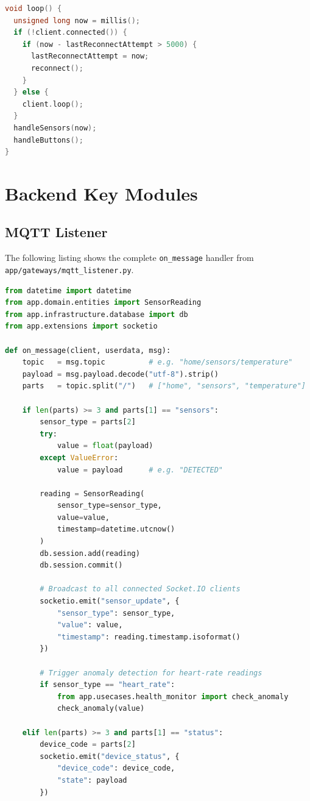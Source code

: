 \begin{lstlisting}[style=mystyle, language=C++, caption={ESP32.ino --- complete firmware source code}, label={lst:esp32}]
void loop() {
  unsigned long now = millis();
  if (!client.connected()) {
    if (now - lastReconnectAttempt > 5000) {
      lastReconnectAttempt = now;
      reconnect();
    }
  } else {
    client.loop();
  }
  handleSensors(now);
  handleButtons();
}
\end{lstlisting}

\chapter{Backend Key Modules}

\section{MQTT Listener}

The following listing shows the complete \texttt{on\_message} handler from \texttt{app/gateways/mqtt\_listener.py}.

\begin{lstlisting}[style=mystyle, language=Python,
  caption={MQTT listener --- on\_message handler},
  label={lst:mqtt}]
from datetime import datetime
from app.domain.entities import SensorReading
from app.infrastructure.database import db
from app.extensions import socketio

def on_message(client, userdata, msg):
    topic   = msg.topic          # e.g. "home/sensors/temperature"
    payload = msg.payload.decode("utf-8").strip()
    parts   = topic.split("/")   # ["home", "sensors", "temperature"]

    if len(parts) >= 3 and parts[1] == "sensors":
        sensor_type = parts[2]
        try:
            value = float(payload)
        except ValueError:
            value = payload      # e.g. "DETECTED"

        reading = SensorReading(
            sensor_type=sensor_type,
            value=value,
            timestamp=datetime.utcnow()
        )
        db.session.add(reading)
        db.session.commit()

        # Broadcast to all connected Socket.IO clients
        socketio.emit("sensor_update", {
            "sensor_type": sensor_type,
            "value": value,
            "timestamp": reading.timestamp.isoformat()
        })

        # Trigger anomaly detection for heart-rate readings
        if sensor_type == "heart_rate":
            from app.usecases.health_monitor import check_anomaly
            check_anomaly(value)

    elif len(parts) >= 3 and parts[1] == "status":
        device_code = parts[2]
        socketio.emit("device_status", {
            "device_code": device_code,
            "state": payload
        })
\end{lstlisting}

